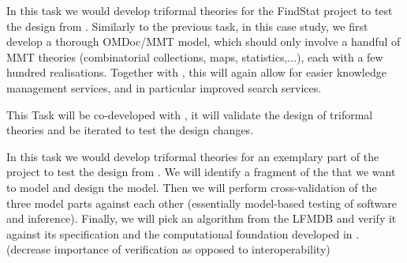 \begin{workpackage}[id=dksbases,wphases=1-48!.5,
  title=Data/Knowledge/Software-Bases,lead=JU,
  ZHRM=12,JURM=36,USHRM=12,UWRM=3,SARM=9]
\begin{tasklist}
\begin{task}[title=FindStat Case Study (triformal theories),id=data-findstat]
  In this task we would develop triformal theories for the FindStat project to test the
  design from .  Similarly to the previous task, in this
  case study, we first develop a thorough OMDoc/MMT model, which should only involve a
  handful of MMT theories (combinatorial collections, maps, statistics,...), each with a
  few hundred realisations. Together with , this will again allow for
  easier knowledge management services, and in particular improved search services.

  This Task will be co-developed with , it will validate
  the design of triformal theories and be iterated to test the design changes.
\end{task}

\begin{task}[title=\LMFDB Case study (triformal theories),id=data-LMFDB]
  In this task we would develop triformal theories for an exemplary part of the \LMFDB
  project to test the design from .  We will identify a
  fragment of the \LMFDB that we want to model and design the model. Then we will perform
  cross-validation of the three model parts against each other (essentially model-based
  testing of software and inference). Finally, we will pick an algorithm from the LFMDB
  and verify it against its specification and the computational foundation developed in
  . (decrease importance of verification as opposed to
  interoperability)
\end{task}




\end{tasklist}
\end{workpackage}
